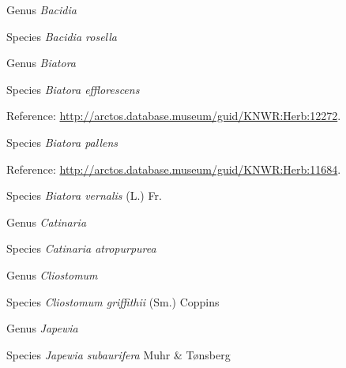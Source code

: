 \documentclass[9pt, article]{memoir}
\begin{document}
\begin{multicols}{2}
\vspace{6pt}\noindent\hspace{30pt}Genus \textit{Bacidia}


\vspace{6pt}\noindent\hspace{36pt}Species \textit{Bacidia rosella}


\vspace{6pt}\noindent\hspace{30pt}Genus \textit{Biatora}


\vspace{6pt}\noindent\hspace{36pt}Species \textit{Biatora efflorescens}


\vspace{6pt}Reference: 
\url{http://arctos.database.museum/guid/KNWR:Herb:12272}.

\vspace{6pt}\noindent\hspace{36pt}Species \textit{Biatora pallens}


\vspace{6pt}Reference: 
\url{http://arctos.database.museum/guid/KNWR:Herb:11684}.

\vspace{6pt}\noindent\hspace{36pt}Species \textit{Biatora vernalis} (L.) Fr.


\vspace{6pt}\noindent\hspace{30pt}Genus \textit{Catinaria}


\vspace{6pt}\noindent\hspace{36pt}Species \textit{Catinaria atropurpurea}


\vspace{6pt}\noindent\hspace{30pt}Genus \textit{Cliostomum}


\vspace{6pt}\noindent\hspace{36pt}Species \textit{Cliostomum griffithii} (Sm.) Coppins


\vspace{6pt}\noindent\hspace{30pt}Genus \textit{Japewia}


\vspace{6pt}\noindent\hspace{36pt}Species \textit{Japewia subaurifera} Muhr \& Tønsberg



\end{multicols}
\end{document}
